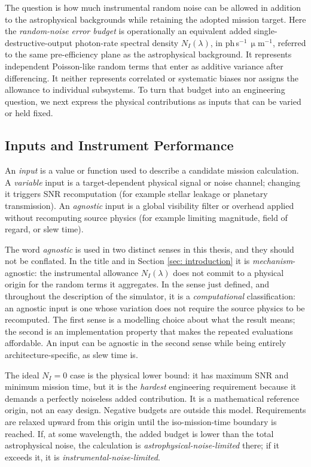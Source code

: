 \documentclass[12pt,a4paper]{article}
\numberwithin{equation}{section}
\numberwithin{figure}{section}
\numberwithin{table}{section}
\begin{document}
The question is how much instrumental random noise can be allowed in addition to the astrophysical backgrounds while retaining the adopted mission target. Here the \textit{random-noise error budget} is operationally an equivalent added single-destructive-output photon-rate spectral density $N_I(\lambda)$, in ph\,s$^{-1}$\,$\upmu$m$^{-1}$, referred to the same pre-efficiency plane as the astrophysical background. It represents independent Poisson-like random terms that enter as additive variance after differencing. It neither represents correlated or systematic biases nor assigns the allowance to individual subsystems. To turn that budget into an engineering question, we next express the physical contributions as inputs that can be varied or held fixed.

\subsection{Inputs and Instrument Performance} \label{sec: intro: params}
An \textit{input} is a value or function used to describe a candidate mission calculation. A \textit{variable} input is a target-dependent physical signal or noise channel; changing it triggers SNR recomputation (for example stellar leakage or planetary transmission). An \textit{agnostic} input is a global visibility filter or overhead applied without recomputing source physics (for example limiting magnitude, field of regard, or slew time).

The word \textit{agnostic} is used in two distinct senses in this thesis, and they should not be conflated. In the title and in Section \ref{sec: introduction} it is \textit{mechanism}-agnostic: the instrumental allowance $N_I(\lambda)$ does not commit to a physical origin for the random terms it aggregates. In the sense just defined, and throughout the description of the simulator, it is a \textit{computational} classification: an agnostic input is one whose variation does not require the source physics to be recomputed. The first sense is a modelling choice about what the result means; the second is an implementation property that makes the repeated evaluations affordable. An input can be agnostic in the second sense while being entirely architecture-specific, as slew time is.

The ideal $N_I=0$ case is the physical lower bound: it has maximum SNR and minimum mission time, but it is the \textit{hardest} engineering requirement because it demands a perfectly noiseless added contribution. It is a mathematical reference origin, not an easy design. Negative budgets are outside this model. Requirements are relaxed upward from this origin until the iso-mission-time boundary is reached. If, at some wavelength, the added budget is lower than the total astrophysical noise, the calculation is \textit{astrophysical-noise-limited} there; if it exceeds it, it is \textit{instrumental-noise-limited}.
\end{document}

